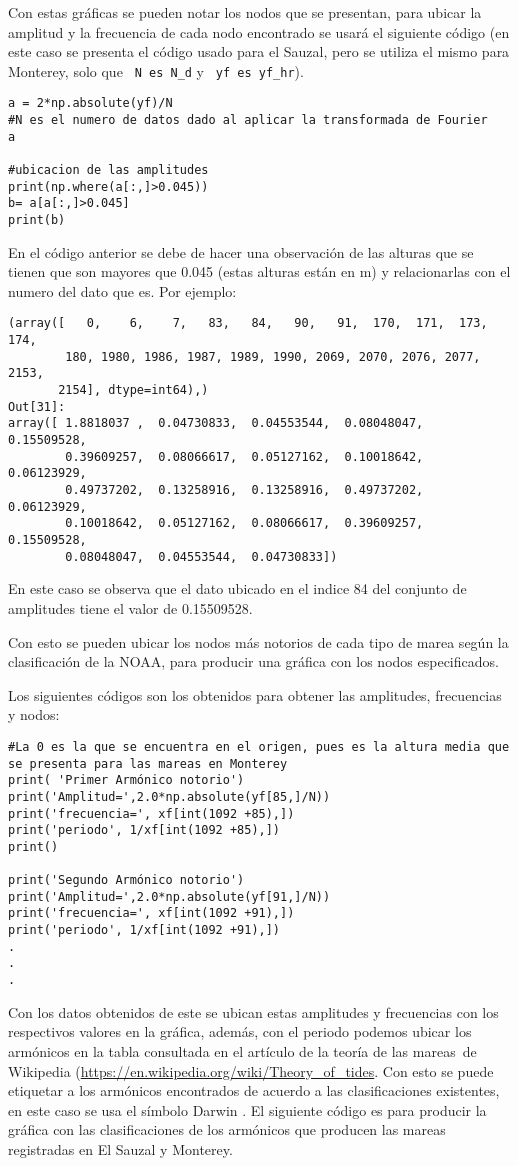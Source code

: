 Con estas gráficas se pueden notar los nodos que se presentan, para ubicar la amplitud y la frecuencia de cada nodo encontrado se usará el siguiente código (en este caso se presenta el código usado para el Sauzal, pero se utiliza el mismo para Monterey, solo que \verb# N es N_d# y \verb# yf es yf_hr#).
\begin{verbatim}
a = 2*np.absolute(yf)/N 
#N es el numero de datos dado al aplicar la transformada de Fourier
a

#ubicacion de las amplitudes
print(np.where(a[:,]>0.045))
b= a[a[:,]>0.045]
print(b)
\end{verbatim}
En el código anterior se debe de hacer una observación de las alturas que se tienen que son mayores que 0.045 (estas alturas están en m) y relacionarlas con el numero del dato que es. Por ejemplo:
\begin{verbatim}
(array([   0,    6,    7,   83,   84,   90,   91,  170,  171,  173,  174,
        180, 1980, 1986, 1987, 1989, 1990, 2069, 2070, 2076, 2077, 2153,
       2154], dtype=int64),)
Out[31]:
array([ 1.8818037 ,  0.04730833,  0.04553544,  0.08048047,  0.15509528,
        0.39609257,  0.08066617,  0.05127162,  0.10018642,  0.06123929,
        0.49737202,  0.13258916,  0.13258916,  0.49737202,  0.06123929,
        0.10018642,  0.05127162,  0.08066617,  0.39609257,  0.15509528,
        0.08048047,  0.04553544,  0.04730833])
\end{verbatim}
En este caso se observa que el dato ubicado en el indice 84  del conjunto de amplitudes tiene el valor de 0.15509528.

Con esto se pueden ubicar los nodos más notorios de cada tipo de marea según la clasificación de la NOAA, para producir una gráfica con los nodos especificados.

Los siguientes códigos son los obtenidos para obtener las amplitudes, frecuencias y nodos:
\begin{verbatim}
#La 0 es la que se encuentra en el origen, pues es la altura media que se presenta para las mareas en Monterey
print( 'Primer Armónico notorio')
print('Amplitud=',2.0*np.absolute(yf[85,]/N))
print('frecuencia=', xf[int(1092 +85),])
print('periodo', 1/xf[int(1092 +85),])
print()

print('Segundo Armónico notorio')
print('Amplitud=',2.0*np.absolute(yf[91,]/N))
print('frecuencia=', xf[int(1092 +91),])
print('periodo', 1/xf[int(1092 +91),])
.
.
.
\end{verbatim}

Con los datos obtenidos de este se ubican estas amplitudes y frecuencias con los respectivos valores en la gráfica, además, con el periodo podemos ubicar los armónicos en la tabla consultada en el artículo de la teoría de las mareas\ de Wikipedia (\url{https://en.wikipedia.org/wiki/Theory_of_tides}. Con esto se puede etiquetar a los armónicos encontrados de acuerdo a las clasificaciones existentes, en este caso se usa el símbolo Darwin \cite{teotide}. El siguiente código es para producir la gráfica con las clasificaciones de los armónicos que producen las mareas registradas en El Sauzal y Monterey.

